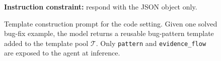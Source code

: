 \begin{figure}[!t]
\begin{tcolorbox}[colback=gray!5, colframe=gray!50,
                  boxrule=0.5pt, arc=2mm,
                  left=4pt, right=4pt, top=3pt, bottom=3pt]
\textbf{Instruction constraint:} respond with the JSON object only.
\end{tcolorbox}
\caption{Template construction prompt for the code setting. Given one solved bug-fix example, the model returns a reusable bug-pattern template added to the template pool $\mathcal{T}$. Only \texttt{pattern} and \texttt{evidence\_flow} are exposed to the agent at inference.}
\label{fig:prompt_template_construction_code}
\end{figure}